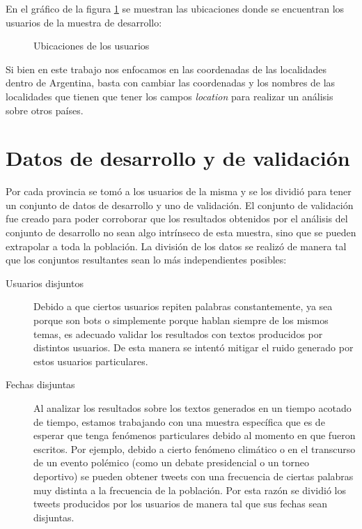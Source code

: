 En el gráfico de la figura \ref{fig:busqueda_usuarios} se muestran las ubicaciones donde se encuentran los usuarios de la muestra de desarrollo:

\begin{figure}[ht]
\centering
\caption{Ubicaciones de los usuarios} 
\label{fig:busqueda_usuarios} 
\end{figure}

Si bien en este trabajo nos enfocamos en las coordenadas de las localidades dentro de Argentina, basta con cambiar las coordenadas y los nombres de las localidades que tienen que tener los campos \textit{location} para realizar un análisis sobre otros países.


\section{Datos de desarrollo y de validación}

Por cada provincia se tomó a los usuarios de la misma y se los dividió para tener un conjunto de datos de desarrollo y uno de validación. El conjunto de validación fue creado para poder corroborar que los resultados obtenidos por el análisis del conjunto de desarrollo no sean algo intrínseco de esta muestra, sino que se pueden extrapolar a toda la población. 
La división de los datos se realizó de manera tal que los conjuntos resultantes sean lo más independientes posibles: 
\begin{description}
    \item [Usuarios disjuntos] Debido a que ciertos usuarios repiten palabras constantemente, ya sea porque son bots o simplemente porque hablan siempre de los mismos temas, es adecuado validar los resultados con textos producidos por distintos usuarios. De esta manera se intentó mitigar el ruido generado por estos usuarios particulares.
    \item [Fechas disjuntas] Al analizar los resultados sobre los textos generados en un tiempo acotado de tiempo, estamos trabajando con una muestra específica que es de esperar que tenga fenómenos particulares debido al momento en que fueron escritos. Por ejemplo, debido a cierto fenómeno climático o en el transcurso de un evento polémico (como un debate presidencial o un torneo deportivo) se pueden obtener tweets con una frecuencia de ciertas palabras muy distinta a la frecuencia de la población. Por esta razón se dividió los tweets producidos por los usuarios de manera tal que sus fechas sean disjuntas.
\end{description}

